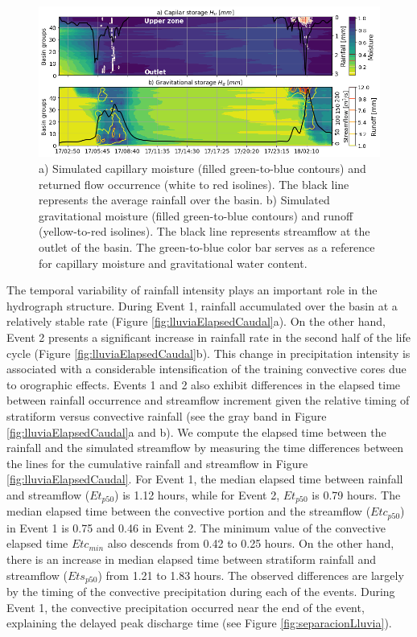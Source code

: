 \documentclass[hess, manuscript]{copernicus}
\begin{document}
\begin{figure}[t!]
\centering
 \includegraphics[width=14cm]{Figures/Evolucion_humedad.png}
 \caption{ a) Simulated capillary moisture (filled green-to-blue contours) and returned flow occurrence (white to red isolines).  The black line represents the average rainfall over the basin. b) Simulated gravitational moisture (filled green-to-blue contours) and runoff (yellow-to-red isolines).  The black line represents streamflow at the outlet of the basin.  The green-to-blue color bar serves as a reference for capillary moisture and gravitational water content.}
    \label{fig:HumedadSpatioTemporal}
\end{figure}

The temporal variability of rainfall intensity plays an important role in the hydrograph structure. During Event 1, rainfall accumulated over the basin at a relatively stable rate (Figure \ref{fig:lluviaElapsedCaudal}a). On the other hand, Event 2 presents a significant increase in rainfall rate in the second half of the life cycle (Figure \ref{fig:lluviaElapsedCaudal}b). This change in precipitation intensity is associated with a considerable intensification of the training convective cores due to orographic effects. Events 1 and 2 also exhibit differences in the elapsed time between rainfall occurrence and streamflow increment given the relative timing of stratiform versus convective rainfall (see the gray band in Figure \ref{fig:lluviaElapsedCaudal}a and b).  We compute the elapsed time between the rainfall and the simulated streamflow by measuring the time differences between the lines for the cumulative rainfall and streamflow in Figure \ref{fig:lluviaElapsedCaudal}. For Event 1, the median elapsed time between rainfall and streamflow ($Et_{p50}$) is 1.12 hours, while for Event 2, $Et_{p50}$ is 0.79 hours. The median elapsed time between the convective portion and the streamflow ($Etc_{p50}$) in Event 1 is 0.75 and 0.46 in Event 2. The minimum value of the convective elapsed time $Etc_{min}$ also descends from 0.42 to 0.25 hours. On the other hand, there is an increase in median elapsed time between stratiform rainfall and streamflow ($Ets_{p50}$) from 1.21 to 1.83 hours. The observed differences are largely by the timing of the convective precipitation during each of the events. During Event 1, the convective precipitation occurred near the end of the event, explaining the delayed peak discharge time (see Figure \ref{fig:separacionLluvia}). \\ 
\end{document}
